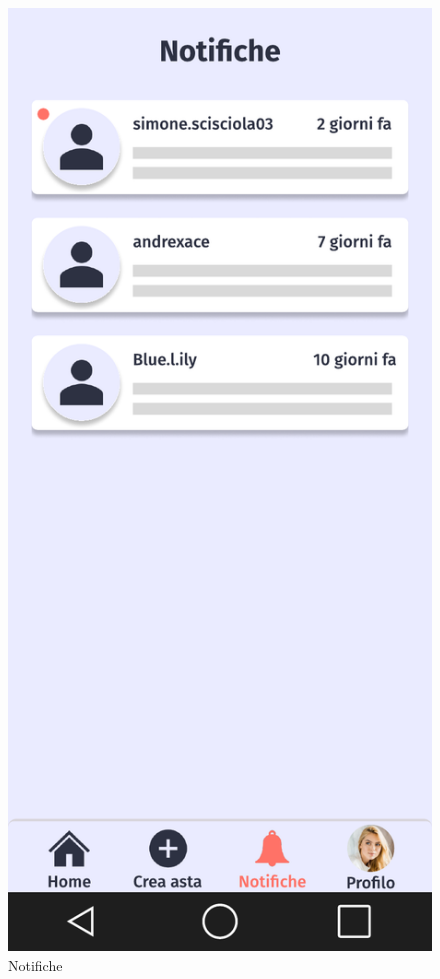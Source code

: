 \begin{figure}[!htb]
\begin{minipage}{0.32\textwidth}
            \includegraphics[width=.7\linewidth]{Immagini/Frames/Compratore/C5.pdf}
            \caption{Notifiche}
        \end{minipage}\hfill
        \begin{minipage}{0.32\textwidth}
            \centering

\end{minipage}
\end{figure}
